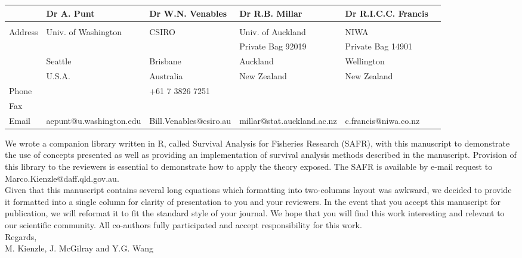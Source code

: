 \documentclass[11pt]{article}
\begin{document}
\begin{spacing}{1.2}
\begin{table}[h!]
\small
\begin{tabular}{llllll} 
\hline
          & Dr A. Punt               & Dr W.N. Venables & Dr R.B. Millar          & Dr R.I.C.C. Francis \\
\hline
&&&& \\
  Address & Univ. of Washington      & CSIRO            & Univ. of Auckland       & NIWA \\ 
          &                          &                  & Private Bag 92019       & Private Bag 14901 \\
          & Seattle                  & Brisbane         & Auckland                & Wellington \\
          & U.S.A.                   & Australia        & New Zealand             & New Zealand \\

Phone     &                          & +61 7 3826 7251  &                         &              \\
Fax       & & & & \\
Email     & aepunt@u.washington.edu  & Bill.Venables@csiro.au & millar@stat.auckland.ac.nz & c.francis@niwa.co.nz \\
\hline
\end{tabular}
\end{table}

We wrote a companion library written in R, called Survival Analysis for Fisheries Research (SAFR), with this manuscript to demonstrate the use of concepts presented as well as providing an implementation of survival analysis methods described in the manuscript. Provision of this library to the reviewers is essential to demonstrate how to apply the theory exposed. The SAFR is available by e-mail request to Marco.Kienzle@daff.qld.gov.au.\\ %


Given that this manuscript contains several long equations which formatting into two-columns layout was awkward, we decided to provide it formatted into a single column for clarity of presentation to you and your reviewers. In the event that you accept this manuscript for publication, we will reformat it to fit the standard style of your journal. We hope that you will find this work interesting and relevant to our scientific community. All co-authors fully participated and accept responsibility for this work. \\

\noindent Regards, \\
\noindent M. Kienzle, J. McGilray and Y.G. Wang

\end{spacing}
\end{document}

